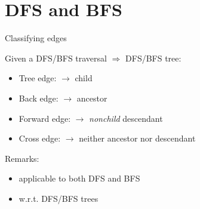\section{DFS and BFS}

\begin{frame}{Classifying edges}
  \begin{definition}
    Given a DFS/BFS traversal $\Rightarrow$ DFS/BFS tree:
    \begin{itemize}
      \item Tree edge: $\to$ child
      \item Back edge: $\to$ ancestor
      \item Forward edge: $\to$ \emph{nonchild} descendant
      \item Cross edge: $\to$ neither ancestor nor descendant
    \end{itemize}
  \end{definition}

  \begin{alertblock}{Remarks:}
    \begin{itemize}
      \item applicable to both DFS and BFS
      \item w.r.t. DFS/BFS trees
    \end{itemize}
  \end{alertblock}
\end{frame}
